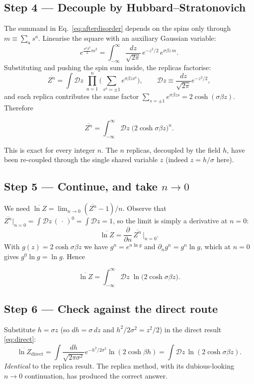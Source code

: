 \documentclass[nobib,justified]{tufte-handout}
\newcommand{\dbar}[1]{\overline{#1}}            %
\newcommand{\Dz}{\mathcal{D}z}                   %
\begin{document}
\subsection{Step 4 --- Decouple by Hubbard--Stratonovich}
The summand in Eq.~\eqref{eq:afterdisorder} depends on the spins only
through $m \equiv \sum_a s^a$. Linearise the square with an auxiliary
Gaussian variable:
\[
  e^{\frac{\sigma^2\beta^2}{2}m^2}
  = \int_{-\infty}^{\infty}\frac{dz}{\sqrt{2\pi}}\,
    e^{-z^2/2}\, e^{\sigma\beta z\, m}.
\]
Substituting and pushing the spin sum inside, the replicas factorise:
\[
  \dbar{Z^n}
  = \int \Dz\; \prod_{a=1}^n\Big(\sum_{s^a=\pm1} e^{\sigma\beta z s^a}\Big),
  \qquad \Dz \equiv \frac{dz}{\sqrt{2\pi}}e^{-z^2/2},
\]
and each replica contributes the same factor
$\sum_{s=\pm1} e^{\sigma\beta z s} = 2\cosh(\sigma\beta z)$. Therefore
\begin{keyresult}
\[
  \dbar{Z^n}
  = \int_{-\infty}^{\infty}\!\Dz\;
    \big(2\cosh\sigma\beta z\big)^{n}.
\]
\end{keyresult}
\noindent
This is exact for every integer $n$. The $n$ replicas, decoupled by the
field $h$, have been re-coupled through the single shared variable $z$
(indeed $z=h/\sigma$ here).

\subsection{Step 5 --- Continue, and take $n\to 0$}
We need $\dbar{\ln Z}=\lim_{n\to0}(\dbar{Z^n}-1)/n$. Observe that
$\dbar{Z^n}\big|_{n=0}=\int\Dz\,(\,\cdot\,)^0 = \int\Dz = 1$, so the limit
is simply a derivative at $n=0$:
\[
  \dbar{\ln Z} = \frac{\partial}{\partial n}\,\dbar{Z^n}\,\Big|_{n=0}.
\]
With $g(z)=2\cosh\sigma\beta z$ we have $g^n=e^{n\ln g}$ and
$\partial_n g^n = g^n\ln g$, which at $n=0$ gives $g^0\ln g=\ln g$. Hence
\begin{keyresult}
\[
  \dbar{\ln Z}
  = \int_{-\infty}^{\infty}\!\Dz\;
    \ln\!\big(2\cosh\sigma\beta z\big).
\]
\end{keyresult}

\subsection{Step 6 --- Check against the direct route}
Substitute $h=\sigma z$ (so $dh=\sigma\,dz$ and $h^2/2\sigma^2 = z^2/2$)
in the direct result \eqref{eq:direct}:
\[
  \dbar{\ln Z}_{\text{direct}}
  = \int\frac{dh}{\sqrt{2\pi\sigma^2}}e^{-h^2/2\sigma^2}\ln(2\cosh\beta h)
  = \int\Dz\,\ln(2\cosh\sigma\beta z).
\]
\emph{Identical} to the replica result. The replica method, with its
dubious-looking $n\to0$ continuation, has produced the correct answer.
\end{document}
